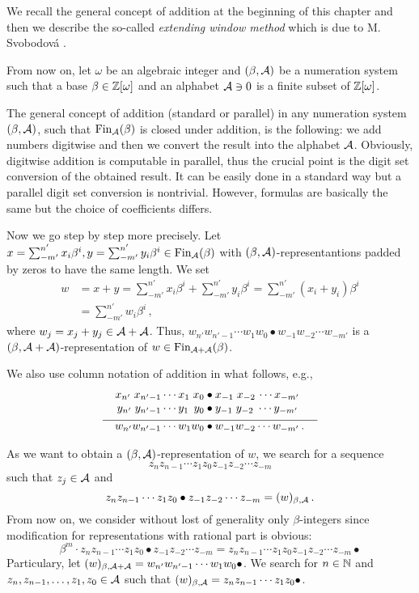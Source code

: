 We recall the general concept of addition at the beginning of this chapter and then we describe the so-called \emph{extending window method} which is due to M. Svobodov\'a \cite{milena}. 

From now on, let $\omega$ be an algebraic integer and $(\beta,\mathcal{A})$ be a numeration system such that a base $\beta \in \mathbb{Z}[\omega]$ and an alphabet $\mathcal{A} \ni 0$ is a finite subset of $\mathbb{Z}[\omega]$. 

The general concept of addition (standard or parallel) in any numeration system $(\beta,\mathcal{A})$, such that $\text{Fin}_{\mathcal{A}}(\beta)$ is closed under addition, is the following: we add numbers digitwise and then we convert the result into the alphabet $\mathcal{A}$. Obviously, digitwise addition is computable in parallel, thus the crucial point is the digit set conversion of the obtained result. It can be easily done in a standard way but a parallel digit set conversion is nontrivial. However, formulas are basically the same but the choice of coefficients differs.

Now we go step by step more precisely. Let $x=\sum_{-m'}^{n'} x_i\beta^i,y=\sum_{-m'}^{n'} y_i\beta^i \in \text{Fin}_{\mathcal{A}}(\beta)$ with $(\beta,\mathcal{A})$-representantions padded by zeros to have the same length. We set 
  \begin{align*}
    w&=x+y =\sum_{-m'}^{n'} x_i\beta^i + \sum_{-m'}^{n'} y_i\beta^i = \sum_{-m'}^{n'} (x_i+y_i)\beta^i \\
    &=\sum_{-m'}^{n'} w_i\beta^i \,,
  \end{align*}
  where $w_j=x_j+y_j \in \mathcal{A} +\mathcal{A}$. Thus, $w_{n'} w_{{n'}-1}\cdots w_1 w_0 \bullet w_{-1} w_{-2} \cdots w_{-m'}$ is a  $(\beta, \mathcal{A}+\mathcal{A})$-representation of $w\in \text{Fin}_{\mathcal{A}+\mathcal{A}}(\beta)$. 

We also use column notation of addition in what follows, e.g.,     
  \begin{align*}
  x_{n'} \;x_{{n'}-1}\cdots x_1 \;x_0 &\bullet x_{-1} \;x_{-2}\, \cdots x_{-m'} \\[-3pt]
  y_{n'} \;y_{{n'}-1}\cdots y_1 \,\;y_0 &\bullet y_{-1} \;y_{-2} \;\cdots y_{-m'} \\[-7pt]
    \line(1,0){90} & \line(1,0){100} \\[-7pt]
  w_{n'} w_{{n'}-1}\cdots w_1 w_0 &\bullet w_{-1} w_{-2} \cdots w_{-m'}\,.
  \end{align*}
  
As we want to obtain a $(\beta,\mathcal{A})$-representation of $w$, we search for a sequence 
  $$z_{n} z_{n-1}\cdots z_1 z_0 z_{-1} z_{-2} \cdots z_{-m}$$ such that $z_j \in \mathcal{A}$ and
  $$
    z_{n} z_{n-1}\cdots z_1 z_0 \bullet z_{-1} z_{-2} \cdots z_{-m}=(w)_{\beta,\mathcal{A}}\,.
  $$
  From now on, we consider without lost of generality only $\beta$-integers since modification for representations with rational part is obvious:
  $$
  \beta^m \cdot z_{n} z_{n-1}\cdots z_1 z_0 \bullet z_{-1} z_{-2} \cdots z_{-m} = z_{n} z_{n-1}\cdots z_1 z_0 z_{-1} z_{-2} \cdots z_{-m} \bullet
  $$  
  Particulary, let $(w)_{\beta, \mathcal{A}+\mathcal{A}}=w_{n'} w_{{n'}-1}\cdots w_1 w_0 \bullet$. We search for $n \in \mathbb{N}$ and $z_{n}, z_{n-1},\dots, z_1, z_0 \in \mathcal{A}$ such that $(w)_{\beta, \mathcal{A}}=z_{n} z_{n-1}\cdots z_1 z_0 \bullet$.   
  

